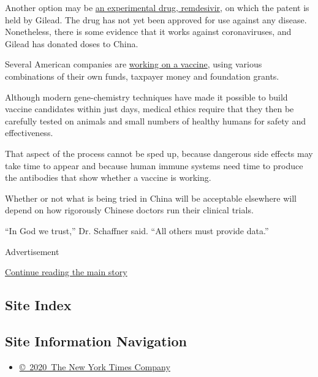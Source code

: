 Another option may be
\href{https://www.gilead.com/news-and-press/company-statements/gilead-sciences-statement-on-the-company-ongoing-response-to-the-2019-new-coronavirus}{an
experimental drug, remdesivir}, on which the patent is held by Gilead.
The drug has not yet been approved for use against any disease.
Nonetheless, there is some evidence that it works against coronaviruses,
and Gilead has donated doses to China.

Several American companies are
\href{https://www.nytimes3xbfgragh.onion/2020/01/28/health/coronavirus-vaccine.html}{working
on a vaccine}, using various combinations of their own funds, taxpayer
money and foundation grants.

Although modern gene-chemistry techniques have made it possible to build
vaccine candidates within just days, medical ethics require that they
then be carefully tested on animals and small numbers of healthy humans
for safety and effectiveness.

That aspect of the process cannot be sped up, because dangerous side
effects may take time to appear and because human immune systems need
time to produce the antibodies that show whether a vaccine is working.

Whether or not what is being tried in China will be acceptable elsewhere
will depend on how rigorously Chinese doctors run their clinical trials.

``In God we trust,'' Dr. Schaffner said. ``All others must provide
data.''

Advertisement

\protect\hyperlink{after-bottom}{Continue reading the main story}

\hypertarget{site-index}{%
\subsection{Site Index}\label{site-index}}

\hypertarget{site-information-navigation}{%
\subsection{Site Information
Navigation}\label{site-information-navigation}}

\begin{itemize}
\tightlist
\item
  \href{https://help.nytimes3xbfgragh.onion/hc/en-us/articles/115014792127-Copyright-notice}{©~2020~The
  New York Times Company}
\end{itemize}

